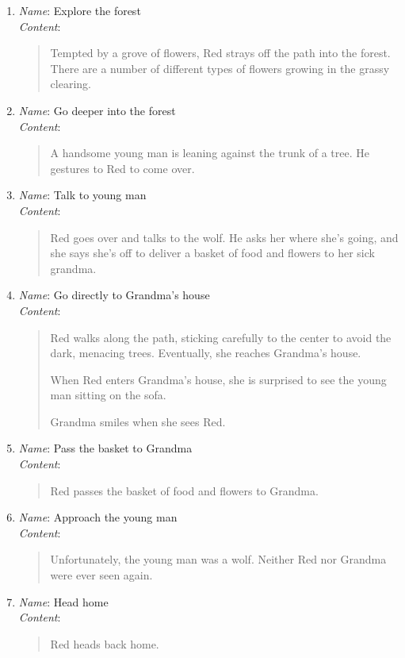 \documentclass{article}
\begin{document}
\begin{enumerate}
  \item \textit{Name}: Explore the forest\\
  \textit{Content}: 
  \begin{quotation}
  Tempted by a grove of flowers, Red strays off the path into the forest. There
  are a number of different types of flowers growing in the grassy clearing.
  \end{quotation}
  \item \textit{Name}: Go deeper into the forest\\
  \textit{Content}: 
  \begin{quotation}
  A handsome young man is leaning against the trunk of a tree. He gestures to
  Red to come over.
  \end{quotation}
  \item \textit{Name}: Talk to young man\\
  \textit{Content}: 
  \begin{quotation}
  Red goes over and talks to the wolf. He asks her where she's going, and she
  says she's off to deliver a basket of food and flowers to her sick grandma. 
  \end{quotation}
  \item \textit{Name}: Go directly to Grandma's house\\
  \textit{Content}: 
  \begin{quotation}
  Red walks along the path, sticking carefully to the center to avoid the dark, menacing trees. Eventually, she reaches Grandma's house.

  When Red enters Grandma's house, she is surprised to see the young man
  sitting on the sofa.
  
  Grandma smiles when she sees Red.
  \end{quotation}
  \item \textit{Name}: Pass the basket to Grandma\\
  \textit{Content}: 
  \begin{quotation}
  Red passes the basket of food and flowers to Grandma.
  \end{quotation}
  \item \textit{Name}: Approach the young man\\
  \textit{Content}: 
  \begin{quotation}
  Unfortunately, the young man was a wolf. Neither Red nor Grandma were ever
  seen again.
  \end{quotation}
  \item \textit{Name}: Head home\\
  \textit{Content}: 
  \begin{quotation}
  Red heads back home.
  \end{quotation}
\end{enumerate}
\end{document}
